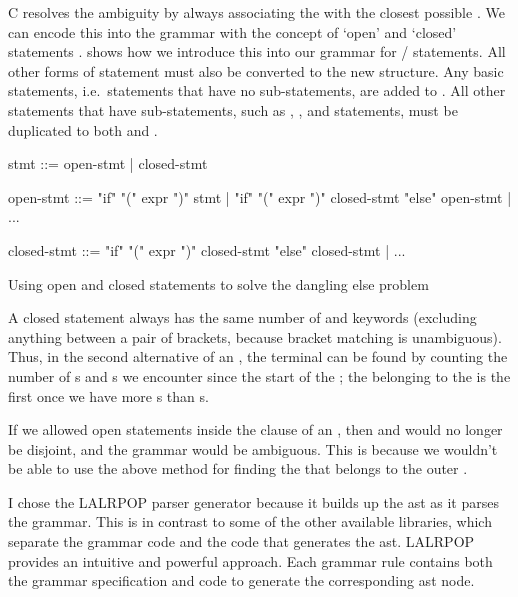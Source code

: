 \documentclass[00-main.tex]{subfiles}
\begin{document}
C resolves the ambiguity by always associating the  with the closest possible .
We can encode this into the grammar with the concept of `open' and `closed' statements .
 shows how we introduce this into our grammar for / statements.
All other forms of statement must also be converted to the new structure.
Any basic statements, i.e.\ statements that have no sub-statements, are added to .
All other statements that have sub-statements, such as , , and  statements, must be duplicated to both  and .


\begin{listing}[!ht]
  \begin{GrammarListing}
    stmt        ::= open-stmt | closed-stmt

    open-stmt   ::= "if" "(" expr ")" stmt
                  | "if" "(" expr ")" closed-stmt "else" open-stmt
                  | ...

    closed-stmt ::= "if" "(" expr ")" closed-stmt "else" closed-stmt
                  | ...
  \end{GrammarListing}
  \caption{Using open and closed statements to solve the dangling else problem}
  \label{lst:open/closed statement grammar}
\end{listing}

A closed statement always has the same number of  and  keywords (excluding anything between a pair of brackets, because bracket matching is unambiguous).
Thus, in the second alternative of an , the  terminal can be found by counting the number of s and s we encounter since the start of the ; the  belonging to the  is the first  once we have more s than s.

If we allowed open statements inside the  clause of an , then  and  would no longer be disjoint, and the grammar would be ambiguous. This is because we wouldn't be able to use the above method for finding the  that belongs to the outer .

I chose the LALRPOP parser generator because it builds up the \gls{ast} as it parses the grammar.
This is in contrast to some of the other available libraries, which separate the grammar code and the code that generates the \gls{ast}\@.
LALRPOP provides an intuitive and powerful approach.
Each grammar rule contains both the grammar specification and code to generate the corresponding \gls{ast} node.
\end{document}
